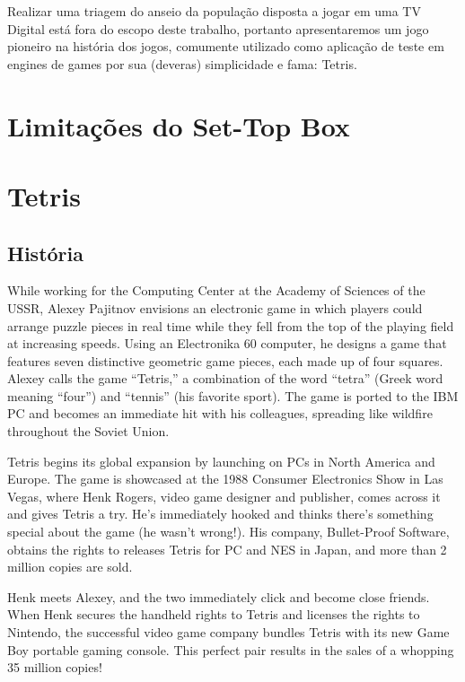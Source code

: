 \documentclass[
	12pt,				%
	openright,			%
	oneside,			%
	a4paper,			%
	brazil,				%
	]{abntex2}
\begin{document}
Realizar uma triagem do anseio da população disposta a jogar em uma TV Digital está fora do escopo deste trabalho, portanto apresentaremos um jogo pioneiro na história dos jogos, comumente utilizado como aplicação de teste em engines de games por sua (deveras) simplicidade e fama: Tetris.

\section{Limitações do Set-Top Box}



\section{Tetris}

\subsection{História}

While working for the Computing Center at the Academy of Sciences of the USSR, Alexey Pajitnov envisions an electronic game in which players could arrange puzzle pieces in real time while they fell from the top of the playing field at increasing speeds. Using an Electronika 60 computer, he designs a game that features seven distinctive geometric game pieces, each made up of four squares. Alexey calls the game “Tetris,” a combination of the word “tetra” (Greek word meaning “four”) and “tennis” (his favorite sport). The game is ported to the IBM PC and becomes an immediate hit with his colleagues, spreading like wildfire throughout the Soviet Union.

Tetris begins its global expansion by launching on PCs in North America and Europe. The game is showcased at the 1988 Consumer Electronics Show in Las Vegas, where Henk Rogers, video game designer and publisher, comes across it and gives Tetris a try. He’s immediately hooked and thinks there’s something special about the game (he wasn’t wrong!). His company, Bullet-Proof Software, obtains the rights to releases Tetris for PC and NES in Japan, and more than 2 million copies are sold.

Henk meets Alexey, and the two immediately click and become close friends. When Henk secures the handheld rights to Tetris and licenses the rights to Nintendo, the successful video game company bundles Tetris with its new Game Boy portable gaming console. This perfect pair results in the sales of a whopping 35 million copies!
\end{document}

